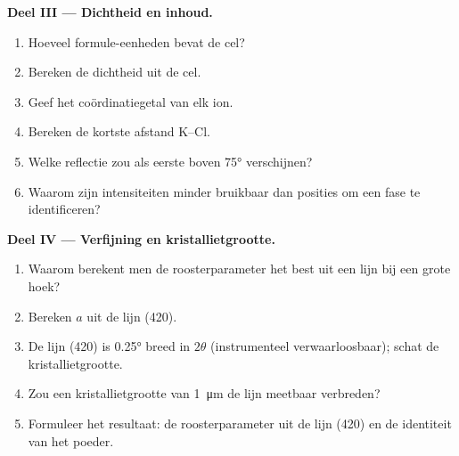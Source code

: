 \begin{problem}
\medskip\noindent\textbf{Deel III --- Dichtheid en inhoud.}
\begin{enumerate}[resume]
  \item Hoeveel formule-eenheden bevat de cel?
  \item Bereken de dichtheid uit de cel.
  \item Geef het coördinatiegetal van elk ion.
  \item Bereken de kortste afstand K--Cl.
  \item Welke reflectie zou als eerste boven \ang{75} verschijnen?
  \item Waarom zijn intensiteiten minder bruikbaar dan posities om een fase
        te identificeren?
\end{enumerate}

\medskip\noindent\textbf{Deel IV --- Verfijning en kristallietgrootte.}
\begin{enumerate}[resume]
  \item Waarom berekent men de roosterparameter het best uit een lijn bij
        een grote hoek?
  \item Bereken $a$ uit de lijn (420).
  \item De lijn (420) is \ang{0.25} breed in $2\theta$ (instrumenteel
        verwaarloosbaar); schat de kristallietgrootte.
  \item Zou een kristallietgrootte van \qty{1}{\micro m} de lijn meetbaar
        verbreden?
  \item Formuleer het resultaat: de roosterparameter uit de lijn (420)
        en de identiteit van het poeder.
\end{enumerate}
\end{problem}
